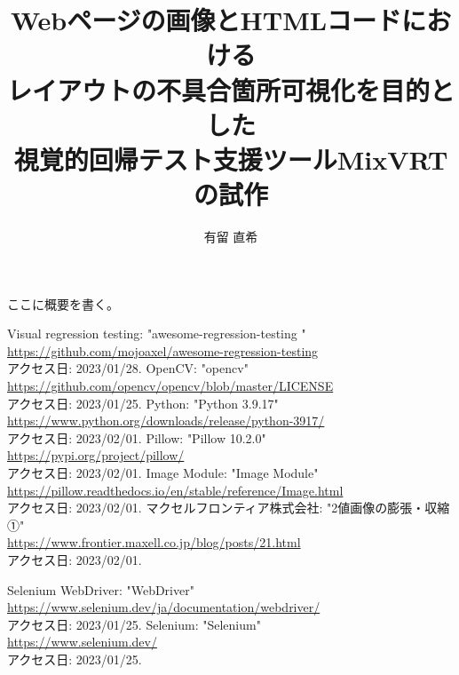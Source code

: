 \documentclass[uplatex, report, a4j, 10pt]{jsbook}
\title{Webページの画像とHTMLコードにおける\\レイアウトの不具合箇所可視化を目的とした\\視覚的回帰テスト支援ツールMixVRTの試作}
\author{有留 直希}
\begin{document}
\maketitle

%
% 
ここに概要を書く。


%
% 








%


%
\begin{thebibliography}{0}
    Visual regression testing: "awesome-regression-testing
    "\\\url{https://github.com/mojoaxel/awesome-regression-testing}\\アクセス日: 2023/01/28.
    OpenCV: "opencv"\\\url{https://github.com/opencv/opencv/blob/master/LICENSE}\\アクセス日: 2023/01/25.
    Python: "Python 3.9.17"\\\url{https://www.python.org/downloads/release/python-3917/}\\アクセス日: 2023/02/01.
    Pillow: "Pillow 10.2.0"\\\url{https://pypi.org/project/pillow/}\\アクセス日: 2023/02/01.
    Image Module: "Image Module"\\\url{https://pillow.readthedocs.io/en/stable/reference/Image.html}\\アクセス日: 2023/02/01.
    マクセルフロンティア株式会社: "2値画像の膨張・収縮①"\\\url{https://www.frontier.maxell.co.jp/blog/posts/21.html}\\アクセス日: 2023/02/01.
    
    Selenium WebDriver: "WebDriver"\\\url{https://www.selenium.dev/ja/documentation/webdriver/}\\アクセス日: 2023/01/25.
    Selenium: "Selenium"\\\url{https://www.selenium.dev/}\\アクセス日: 2023/01/25. 
\end{thebibliography}

\end{document}
